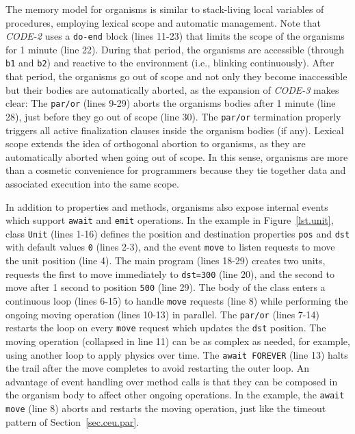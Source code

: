 \documentclass{sigplanconf}
\newcommand{\code}[1] {{\small{\texttt{#1}}}}
\newcommand{\1}{\;}
\newcommand{\2}{\;\;}
\newcommand{\3}{\;\;\;}
\newcommand{\5}{\;\;\;\;\;}
\begin{document}
%

The memory model for organisms is similar to stack-living local variables of 
procedures, employing lexical scope and automatic management.
Note that \emph{CODE-2} uses a \code{do-end} block (lines 11-23) that limits 
the scope of the organisms for 1 minute (line 22).
%
During that period, the organisms are accessible (through \code{b1} and 
\code{b2}) and reactive to the environment (i.e., blinking continuously).
%
After that period, the organisms go out of scope and not only they become 
inaccessible but their bodies are automatically aborted, as the expansion of 
\emph{CODE-3} makes clear:
%
The \code{par/or} (lines 9-29) aborts the organisms bodies after 1 minute (line 
28), just before they go out of scope (line 30).
%
The \code{par/or} termination properly triggers all active finalization clauses 
inside the organism bodies (if any).
%
Lexical scope extends the idea of orthogonal abortion to organisms, as they are 
automatically aborted when going out of scope.
%
In this sense, organisms are more than a cosmetic convenience for programmers 
because they tie together data and associated execution into the same scope.

In addition to properties and methods, organisms also expose internal events 
which support \code{await} and \code{emit} operations.
%
In the example in Figure~\ref{lst.unit}, class \code{Unit} (lines 1-16) defines 
the position and destination properties \code{pos} and \code{dst} with default 
values \code{0} (lines 2-3), and the event \code{move} to listen requests to 
move the unit position (line 4).
%
The main program (lines 18-29) creates two units, requests the first to move 
immediately to \code{dst=300} (line 20), and the second to move after 1 second 
to position \code{500} (line 29).
%
The body of the class enters a continuous loop (lines 6-15) to handle 
\code{move} requests (line 8) while performing the ongoing moving operation 
(lines 10-13) in parallel.
The \code{par/or} (lines 7-14) restarts the loop on every \code{move} request 
which updates the \code{dst} position.
%
The moving operation (collapsed in line 11) can be as complex as needed, for 
example, using another loop to apply physics over time.
The \code{await FOREVER} (line 13) halts the trail after the move completes to 
avoid restarting the outer loop.
%
An advantage of event handling over method calls is that they can be composed 
in the organism body to affect other ongoing operations.
In the example, the \code{await move} (line 8) aborts and restarts the moving 
operation, just like the timeout pattern of Section~\ref{sec.ceu.par}.
\end{document}
